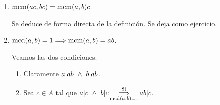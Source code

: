 \begin{enumerate}
    Una vez demostrada la primera igualdad, para la segunda tenemos que:
    \begin{equation*}
        \mcm(a,b,c) = \mcm(b,c,a) = \mcm(\mcm(b,c), a) = \mcm(a,\mcm(b,c))
    \end{equation*}

    \item $\operatorname{mcm}(ac,bc) = \operatorname{mcm}(a,b)c$.
    
    Se deduce de forma directa de la definición. Se deja como \underline{ejercicio}.

    \item $\operatorname{mcd}(a,b)=1 \Longrightarrow \operatorname{mcm}(a,b)=ab$.

    Veamos las dos condiciones:
    \begin{enumerate}
        \item Claramente $a|ab \ \land \  b|ab$.
        \item Sea $c \in A$ tal que $\displaystyle a|c \ \land \  b|c \mathop{\Longrightarrow}_{\operatorname{mcd}(a,b)=1}^{8)} ab|c$.\\
    \end{enumerate}
\end{enumerate}



